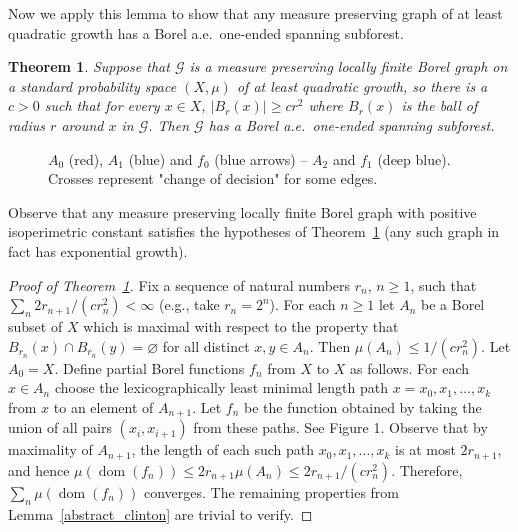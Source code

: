 \documentclass[11pt]{amsart}
\theoremstyle{definition}
\theoremstyle{plain}
\newtheorem{theorem}[definition]{Theorem}
\newcommand{\<}{\langle}
\renewcommand{\>}{\rangle}
\DeclareMathOperator{\dom}{dom}
\renewcommand{\emptyset}{\varnothing}
\newcommand{\Ggraph}{\mathcal{G}}
\begin{document}
Now we apply this lemma to show that any measure preserving graph of at least quadratic
growth has a Borel a.e.\ one-ended spanning subforest.

\begin{theorem}\label{thm:quad}
  Suppose that ${\Ggraph}$ is a measure preserving locally finite Borel graph on a standard
  probability space $(X,\mu)$ of at least quadratic growth, so there is a $c >
  0$ such that for every $x\in X$, $|B_r(x)| \geq c r^2$ where $B_r(x)$ is the
  ball of radius $r$ around $x$ in ${\Ggraph}$. Then ${\Ggraph}$ has a Borel a.e.\ one-ended spanning subforest.
\end{theorem}

\begin{figure}[h]
\def\svgwidth{\columnwidth}
\resizebox{67mm}{!}{}
\hskip10pt
\resizebox{67mm}{!}{}
\caption{$A_0$ (red), $A_1$ (blue) and $f_0$ (blue arrows) -- $A_2$ and $f_1$  (deep blue).
Crosses represent  "change of decision" for some edges.}
\end{figure}

Observe that any measure preserving locally finite Borel graph with positive isoperimetric constant satisfies the hypotheses of Theorem~\ref{thm:quad} (any such graph in fact has exponential growth).

\begin{proof}[Proof of Theorem~\ref{thm:quad}]
  Fix a sequence of natural numbers $r_n$, $n\geq 1$, such that $\sum _{n} 2r_{n+1}/(cr_n^2)<\infty$ (e.g., take $r_n=2^n$).  For each $n\geq 1$ let $A_n$ be a Borel subset of $X$ which is maximal with respect to the property that $B_{r_n}(x)\cap B_{r_n}(y)=\emptyset$ for all distinct $x,y\in A_n$. Then $\mu (A_n)\leq 1/(cr_n^2)$. Let $A_0=X$. Define partial Borel functions $f_n$ from $X$ to $X$ as follows. For
  each $x \in A_n$ choose the lexicographically least minimal length path $x = x_0, x_1,
  \ldots, x_k$ from $x$ to an element of $A_{n+1}$. Let $f_n$ be the function obtained by taking the union of all
  pairs $(x_i, x_{i+1})$ from these paths. See Figure 1.
  Observe that by maximality of $A_{n+1}$, the length of each such path $x_0,x_1,\dots , x_k$ is at most $2r_{n+1}$, and hence $\mu (\dom (f_n)) \leq 2r_{n+1}\mu (A_n)\leq 2r_{n+1}/(cr_n^2)$. Therefore, $\sum_n \mu(\dom(f_n))$ converges. The remaining properties
  from Lemma~\ref{abstract_clinton} are trivial to verify.
\end{proof}
\end{document}
